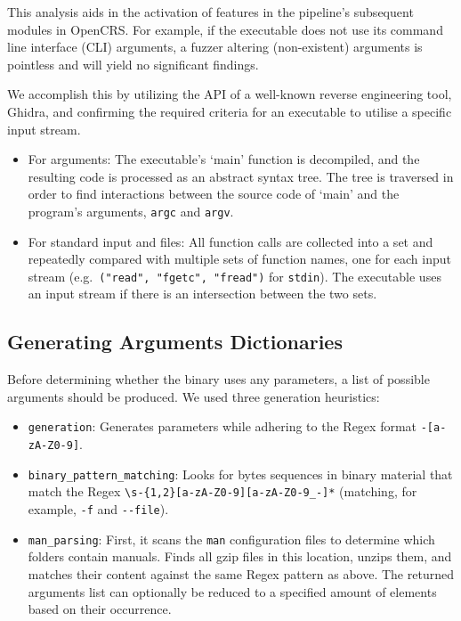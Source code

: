 \documentclass[../main.tex]{subfiles}
\begin{document}
This analysis aids in the activation of features in the pipeline's subsequent
modules in OpenCRS. For example, if the executable does not use its command
line interface (CLI) arguments, a fuzzer altering (non-existent) arguments is
pointless and will yield no significant findings.

We accomplish this by utilizing the API of a well-known reverse engineering
tool, Ghidra, and confirming the required criteria for an executable to utilise
a specific input stream.

\begin{itemize}
  \tightlist
  \item
        For arguments: The executable's `main' function is decompiled, and the
        resulting code is processed as an abstract syntax tree. The tree is traversed in order
        to find interactions between the source code of `main' and the
        program's arguments, \texttt{argc} and \texttt{argv}.
  \item
        For standard input and files: All function calls are collected into a
        set and repeatedly compared with multiple sets of function names, one
        for each input stream (e.g.~\texttt{("read",\ "fgetc",\ "fread")} for
        \texttt{stdin}). The executable uses an input stream if there is an
        intersection between the two sets.
\end{itemize}

\hypertarget{generating-arguments-dictionaries}{%
  \subsection{Generating Arguments
    Dictionaries}\label{generating-arguments-dictionaries}}

Before determining whether the binary uses any parameters, a list of possible
arguments should be produced. We used three generation heuristics:

\begin{itemize}
  \tightlist
  \item
        \texttt{generation}: Generates parameters while adhering to the
        Regex format \texttt{-{[}a-zA-Z0-9{]}}.
  \item
        \texttt{binary\_pattern\_matching}: Looks for bytes sequences in
        binary material that match the Regex
        \texttt{\textbackslash{}s-\{1,2\}{[}a-zA-Z0-9{]}{[}a-zA-Z0-9\_-{]}*}
        (matching, for example, \texttt{-f} and \texttt{-\/-file}).
  \item
        \texttt{man\_parsing}: First, it scans the \texttt{man} configuration
        files to determine which folders contain manuals. Finds all gzip files
        in this location, unzips them, and matches their content against
        the same Regex pattern as above. The returned arguments list can
        optionally be reduced to a specified amount of elements based on their
        occurrence.
\end{itemize}
\end{document}
